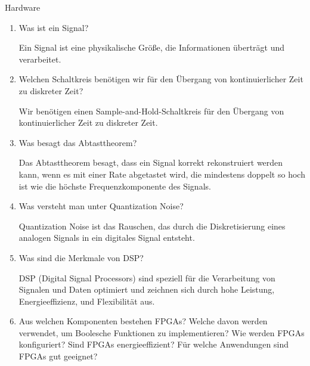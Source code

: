 \documentclass{article}
\begin{document}
\begin{exercise}{Hardware}
  \begin{enumerate}
    \item Was ist ein Signal?

          \begin{solution}
            Ein Signal ist eine physikalische Größe, die Informationen überträgt und verarbeitet.
          \end{solution}

    \item Welchen Schaltkreis benötigen wir für den Übergang von kontinuierlicher Zeit zu diskreter Zeit?

          \begin{solution}
            Wir benötigen einen Sample-and-Hold-Schaltkreis für den Übergang von kontinuierlicher Zeit zu diskreter Zeit.
          \end{solution}

    \item Was besagt das Abtasttheorem?

          \begin{solution}
            Das Abtasttheorem besagt, dass ein Signal korrekt rekonstruiert werden kann, wenn es mit einer Rate abgetastet wird, die mindestens doppelt so hoch ist wie die höchste Frequenzkomponente des Signals.
          \end{solution}

    \item Was versteht man unter Quantization Noise?

          \begin{solution}
            Quantization Noise ist das Rauschen, das durch die Diskretisierung eines analogen Signals in ein digitales Signal entsteht.
          \end{solution}

    \item Was sind die Merkmale von DSP?

          \begin{solution}
            DSP (Digital Signal Processors) sind speziell für die Verarbeitung von Signalen und Daten optimiert und zeichnen sich durch hohe Leistung, Energieeffizienz, und Flexibilität aus.
          \end{solution}

    \item Aus welchen Komponenten bestehen FPGAs? Welche davon werden verwendet, um Boolesche Funktionen zu implementieren? Wie werden FPGAs konfiguriert? Sind FPGAs energieeffizient? Für welche Anwendungen sind FPGAs gut geeignet?


\end{enumerate}
\end{exercise}
\end{document}
